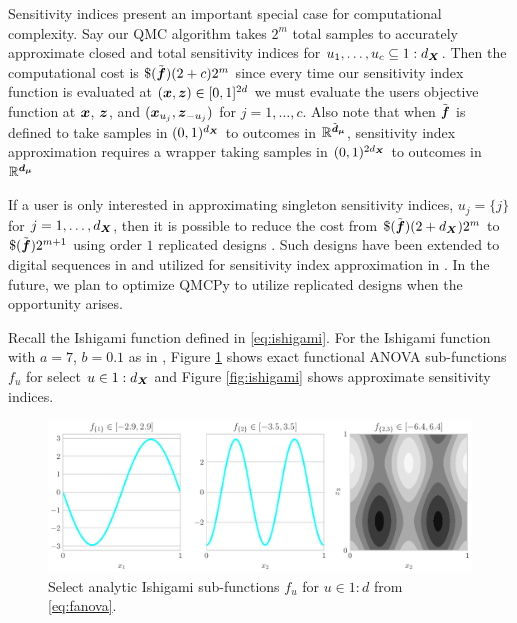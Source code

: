 \documentclass{article}[12pt]
\begin{document}
Sensitivity indices present an important special case for computational complexity. Say our QMC algorithm takes $2^m$ total samples to accurately approximate closed and total sensitivity indices for $u_1,\dots,u_c \subseteq 1:d_{\bX}$. Then the computational cost is $\$(\tilde{\bf})(2+c)2^m$ since every time our sensitivity index function is evaluated at $(\bx,\bz) \in [0,1]^{2d}$ we must evaluate the users objective function at $\bx$, $\bz$, and $(\bx_{u_j},\bz_{-{u_j}})$ for $j=1,\dots,c$. Also note that when $\tilde{\bf}$ is defined to take samples in  $(0,1)^{d_{\bX}}$ to outcomes in $\bbR^{\tilde{\bd}_{\bmu}}$, sensitivity index approximation requires a wrapper taking samples in $(0,1)^{2d_{\bX}}$ to outcomes in $\bbR^{\bd_{\bmu}}$

If a user is only interested in approximating singleton sensitivity indices, $u_j = \{j\}$ for $j=1,\dots,d_{\bX}$, then it is possible to reduce the cost from $\$(\tilde{\bf})(2+d_{\bX})2^m$ to $\$(\tilde{\bf})2^{m+1}$ using order $1$ replicated designs \cite{alex2008comparison,tissot2015randomized}. Such designs have been extended to  digital sequences in \cite{replicated_designs_sobol_seq} and utilized for sensitivity index approximation in \cite{reliable_sobol_indices_approx}. In the future, we plan to optimize QMCPy to utilize replicated designs when the opportunity arises.

Recall the Ishigami function defined in \eqref{eq:ishigami}. For the Ishigami function with $a=7$, $b=0.1$ as in \cite{crestaux2007polynomial,marrel2009calculations}, Figure \ref{fig:ishigami_fu} shows exact functional ANOVA sub-functions $f_u$ for select $u \in 1:d_{\bX}$ and Figure \ref{fig:ishigami} shows approximate sensitivity indices. 

\begin{figure}[H]
    \centering
    \includegraphics[width=.8\textwidth]{figs/ishigami_fu.pdf}
    \caption{Select analytic Ishigami sub-functions $f_u$ for $u \in 1:d$ from \eqref{eq:fanova}.}
    \label{fig:ishigami_fu}
\end{figure}
\end{document}
